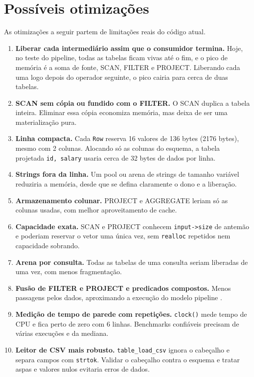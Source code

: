 \documentclass[11pt,a4paper]{article}
\begin{document}
\section{Possíveis otimizações}
As otimizações a seguir partem de limitações reais do código atual.
\begin{enumerate}
    \item \textbf{Liberar cada intermediário assim que o consumidor termina.} Hoje, no teste do pipeline, todas as tabelas ficam vivas até o fim, e o pico de memória é a soma de fonte, SCAN, FILTER e PROJECT. Liberando cada uma logo depois do operador seguinte, o pico cairia para cerca de duas tabelas.
    \item \textbf{SCAN sem cópia ou fundido com o FILTER.} O SCAN duplica a tabela inteira. Eliminar essa cópia economiza memória, mas deixa de ser uma materialização pura.
    \item \textbf{Linha compacta.} Cada \texttt{Row} reserva 16 valores de 136 bytes (2176 bytes), mesmo com 2 colunas. Alocando só as colunas do esquema, a tabela projetada \texttt{id, salary} usaria cerca de 32 bytes de dados por linha.
    \item \textbf{Strings fora da linha.} Um pool ou arena de strings de tamanho variável reduziria a memória, desde que se defina claramente o dono e a liberação.
    \item \textbf{Armazenamento colunar.} PROJECT e AGGREGATE leriam só as colunas usadas, com melhor aproveitamento de cache.
    \item \textbf{Capacidade exata.} SCAN e PROJECT conhecem \texttt{input->size} de antemão e poderiam reservar o vetor uma única vez, sem \texttt{realloc} repetidos nem capacidade sobrando.
    \item \textbf{Arena por consulta.} Todas as tabelas de uma consulta seriam liberadas de uma vez, com menos fragmentação.
    \item \textbf{Fusão de FILTER e PROJECT e predicados compostos.} Menos passagens pelos dados, aproximando a execução do modelo pipeline \cite{graefe}.
    \item \textbf{Medição de tempo de parede com repetições.} \texttt{clock()} mede tempo de CPU e fica perto de zero com 6 linhas. Benchmarks confiáveis precisam de várias execuções e da mediana.
    \item \textbf{Leitor de CSV mais robusto.} \texttt{table\_load\_csv} ignora o cabeçalho e separa campos com \texttt{strtok}. Validar o cabeçalho contra o esquema e tratar aspas e valores nulos evitaria erros de dados.
\end{enumerate}
\end{document}

